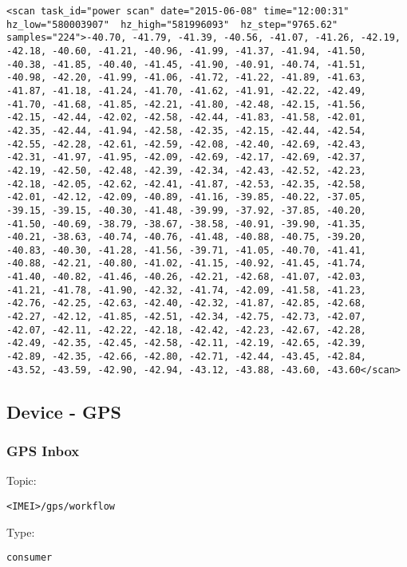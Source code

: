 \begin{lstlisting}
<scan task_id="power scan" date="2015-06-08" time="12:00:31" hz_low="580003907"  hz_high="581996093"  hz_step="9765.62" samples="224">-40.70, -41.79, -41.39, -40.56, -41.07, -41.26, -42.19, -42.18, -40.60, -41.21, -40.96, -41.99, -41.37, -41.94, -41.50, -40.38, -41.85, -40.40, -41.45, -41.90, -40.91, -40.74, -41.51, -40.98, -42.20, -41.99, -41.06, -41.72, -41.22, -41.89, -41.63, -41.87, -41.18, -41.24, -41.70, -41.62, -41.91, -42.22, -42.49, -41.70, -41.68, -41.85, -42.21, -41.80, -42.48, -42.15, -41.56, -42.15, -42.44, -42.02, -42.58, -42.44, -41.83, -41.58, -42.01, -42.35, -42.44, -41.94, -42.58, -42.35, -42.15, -42.44, -42.54, -42.55, -42.28, -42.61, -42.59, -42.08, -42.40, -42.69, -42.43, -42.31, -41.97, -41.95, -42.09, -42.69, -42.17, -42.69, -42.37, -42.19, -42.50, -42.48, -42.39, -42.34, -42.43, -42.52, -42.23, -42.18, -42.05, -42.62, -42.41, -41.87, -42.53, -42.35, -42.58, -42.01, -42.12, -42.09, -40.89, -41.16, -39.85, -40.22, -37.05, -39.15, -39.15, -40.30, -41.48, -39.99, -37.92, -37.85, -40.20, -41.50, -40.69, -38.79, -38.67, -38.58, -40.91, -39.90, -41.35, -40.21, -38.63, -40.74, -40.76, -41.48, -40.88, -40.75, -39.20, -40.83, -40.30, -41.28, -41.56, -39.71, -41.05, -40.70, -41.41, -40.88, -42.21, -40.80, -41.02, -41.15, -40.92, -41.45, -41.74, -41.40, -40.82, -41.46, -40.26, -42.21, -42.68, -41.07, -42.03, -41.21, -41.78, -41.90, -42.32, -41.74, -42.09, -41.58, -41.23, -42.76, -42.25, -42.63, -42.40, -42.32, -41.87, -42.85, -42.68, -42.27, -42.12, -41.85, -42.51, -42.34, -42.75, -42.73, -42.07, -42.07, -42.11, -42.22, -42.18, -42.42, -42.23, -42.67, -42.28, -42.49, -42.35, -42.45, -42.58, -42.11, -42.19, -42.65, -42.39, -42.89, -42.35, -42.66, -42.80, -42.71, -42.44, -43.45, -42.84, -43.52, -43.59, -42.90, -42.94, -43.12, -43.88, -43.60, -43.60</scan>
\end{lstlisting}

\subsection{Device - GPS}
\subsubsection{GPS Inbox}

Topic:
\begin{lstlisting}<IMEI>/gps/workflow\end{lstlisting}
Type:
\begin{lstlisting}consumer\end{lstlisting}





